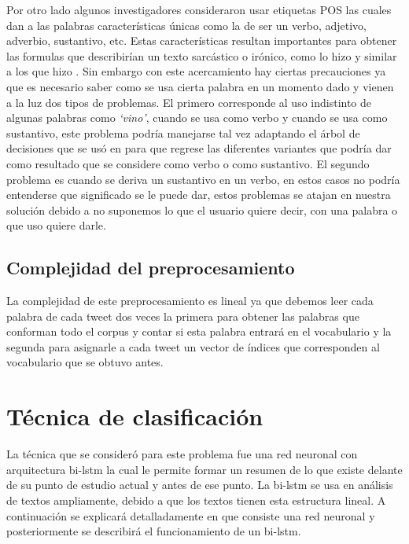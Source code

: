 \par Por otro lado algunos investigadores consideraron usar etiquetas \gls{POS} las cuales dan a las palabras características únicas como la de ser un verbo, adjetivo, adverbio, sustantivo, etc. Estas características resultan importantes para obtener las formulas que describirían un texto sarcástico o irónico, como lo hizo \cite{barbieri2014italian} y similar a los que hizo \cite{davidov2010semi}. Sin embargo con este acercamiento hay ciertas precauciones ya que es necesario saber como se usa cierta palabra en un momento dado y vienen a la luz dos tipos de problemas. El primero corresponde al uso indistinto de algunas palabras como \textit{`vino'}, cuando se usa como verbo y cuando se usa como sustantivo, este problema podría manejarse tal vez adaptando el árbol de decisiones que se usó en \cite{barbieri2014italian} para que regrese las diferentes variantes que podría dar como resultado que se considere como verbo o como sustantivo. El segundo problema es cuando se deriva un sustantivo en un verbo, en estos casos no podría entenderse que significado se le puede dar, estos problemas se atajan en nuestra solución debido a no suponemos lo que el usuario quiere decir, con una palabra o que uso quiere darle.

		
\subsection{Complejidad del preprocesamiento}
La complejidad de este preprocesamiento es lineal ya que debemos leer cada palabra de cada tweet dos veces la primera para obtener las palabras que conforman todo el corpus y contar si esta palabra entrará en el vocabulario y la segunda para asignarle a cada tweet un vector de índices que corresponden al vocabulario que se obtuvo antes.
\section{Técnica de clasificación}
	
\par La técnica que se consideró para este problema fue una red neuronal con arquitectura \gls{bi-lstm} la cual le permite formar un resumen de lo que existe delante de su punto de estudio actual y antes de ese punto. La \gls{bi-lstm} se usa en análisis de textos ampliamente, debido a que los textos tienen esta estructura lineal. A continuación se explicará detalladamente en que consiste una red neuronal y posteriormente se describirá el funcionamiento de un \gls{bi-lstm}.
	
